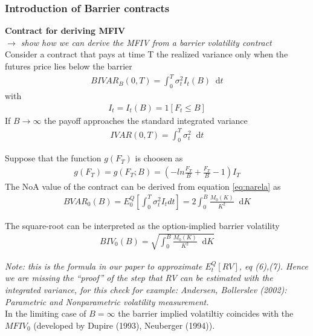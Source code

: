 \documentclass{article}
\newcommand*\diff{\mathop{}\!\mathrm{d}}
\begin{document}
\subsubsection{Introduction of Barrier contracts}

\textbf{Contract for deriving MFIV}\\
\textit{$\rightarrow$ show how we can derive the MFIV from a barrier volatility contract}\\

Consider a contract that pays at time T the realized variance only when the futures price lies below the barrier
\begin{align*}
BIVAR_{B}(0,T) = \int_{0}^{T} \sigma_{t}^{2} I_{t}(B) \diff t
\end{align*}
with 
\begin{align*}
I_{t} = I_{t}(B) = 1[F_{t} \leq B]
\end{align*}
If $B \rightarrow \infty$ the payoff approaches the standard integrated variance
\begin{align*}
IV AR(0,T) = \int_{0}^{T} \sigma_{t}^{2} \diff t
\end{align*}

Suppose that the function $g(F_{T})$ is choosen as
\begin{align*}
g(F_{T}) = g(F_{T};B) = \left (- ln\frac{F_{T}}{B} + \frac{F_{T}}{B} - 1 \right) I_{T}
\end{align*}
The NoA value of the contract can be derived from equation \ref{eq:narela} as
\begin{align*}
BV AR_{0}(B) = E_{0}^{Q} \left [\int_{0}^{T} \sigma_{t}^{2} I_{t} dt \right] = 2 \int_{0}^{B} \frac{M_{0}(K)}{K^{2}} \diff K
\end{align*}

The square-root can be interpreted as the option-implied barrier volatility
\begin{align*}
BIV_{0}(B) = \sqrt{\int_{0}^{B} \frac{M_{0}(K)}{K^{2}} \diff K}
\end{align*}

\textit{Note: this is the formula in our paper to approximate $E_{t}^{Q}[RV]$, eq (6),(7). Hence we are missing the ``proof'' of the step that RV can be estimated with the integrated variance, for this check for example: Andersen, Bollerslev (2002): Parametric and Nonparametric volatility measurement.}\\

In the limiting case of $B = \infty$ the barrier implied volatiltiy coincides with the $MFIV_{0}$ (developed by Dupire (1993), Neuberger (1994)).\\
\end{document}
